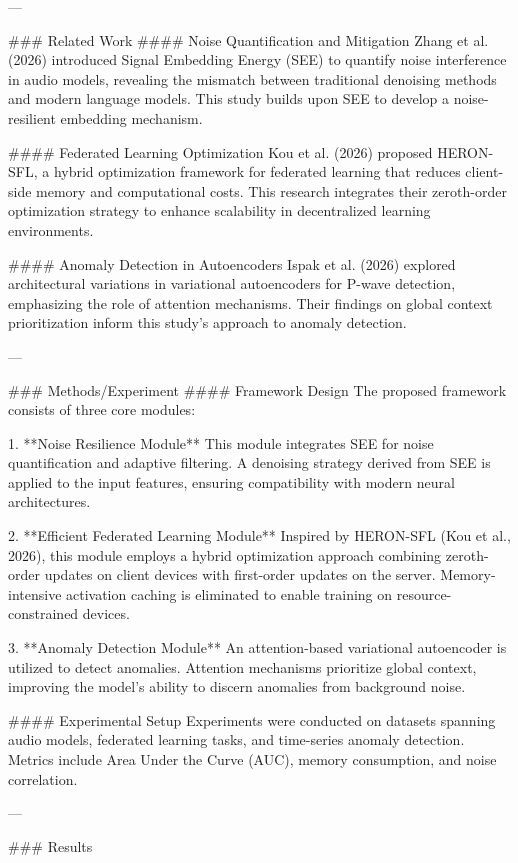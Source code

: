 ---

### Related Work  
#### Noise Quantification and Mitigation  
Zhang et al. (2026) introduced Signal Embedding Energy (SEE) to quantify noise interference in audio models, revealing the mismatch between traditional denoising methods and modern language models. This study builds upon SEE to develop a noise-resilient embedding mechanism.

#### Federated Learning Optimization  
Kou et al. (2026) proposed HERON-SFL, a hybrid optimization framework for federated learning that reduces client-side memory and computational costs. This research integrates their zeroth-order optimization strategy to enhance scalability in decentralized learning environments.

#### Anomaly Detection in Autoencoders  
Ispak et al. (2026) explored architectural variations in variational autoencoders for P-wave detection, emphasizing the role of attention mechanisms. Their findings on global context prioritization inform this study's approach to anomaly detection.

---

### Methods/Experiment  
#### Framework Design  
The proposed framework consists of three core modules:  

1. **Noise Resilience Module**  
   This module integrates SEE for noise quantification and adaptive filtering. A denoising strategy derived from SEE is applied to the input features, ensuring compatibility with modern neural architectures.

2. **Efficient Federated Learning Module**  
   Inspired by HERON-SFL (Kou et al., 2026), this module employs a hybrid optimization approach combining zeroth-order updates on client devices with first-order updates on the server. Memory-intensive activation caching is eliminated to enable training on resource-constrained devices.

3. **Anomaly Detection Module**  
   An attention-based variational autoencoder is utilized to detect anomalies. Attention mechanisms prioritize global context, improving the model's ability to discern anomalies from background noise.

#### Experimental Setup  
Experiments were conducted on datasets spanning audio models, federated learning tasks, and time-series anomaly detection. Metrics include Area Under the Curve (AUC), memory consumption, and noise correlation.  

---

### Results  

